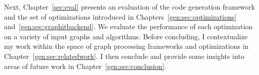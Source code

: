 Next, Chapter~\ref{sec:eval} presents an evaluation of the code generation framework and the set of optimizations introduced in Chapters~\ref{gen:sec:optimizations} and~\ref{gen:sec:graphitbackend}.
We evaluate the performance of each optimization on a variety of input graphs and algorithms.
%
Before concluding, I contextualize my work within the space of graph processing frameworks and optimizations in Chapter~\ref{gen:sec:relatedwork}.
I then conclude and provide some insights into areas of future work in Chapter~\ref{gen:sec:conclusion}.



